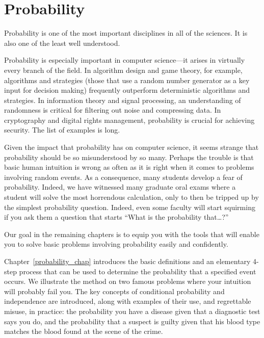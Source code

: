 \part{Probability}
\label{part:probability}

\partintro
{}

Probability is one of the most important disciplines in all of the
sciences.  It is also one of the least well understood.

Probability is especially important in computer science---it arises in
virtually every branch of the field.  In algorithm design and game
theory, for example,  algorithms and strategies
(those that use a random number generator as a key input for decision
making) frequently outperform deterministic algorithms and
strategies.  In information theory and signal processing, an
understanding of randomness is critical for filtering out noise and
compressing data.  In cryptography and digital rights management,
probability is crucial for achieving security.  The list of examples
is long.

Given the impact that probability has on computer science, it seems
strange that probability should be so misunderstood by so many.
Perhaps the trouble is that basic human intuition is wrong as often as
it is right when it comes to problems involving random events.  As a
consequence, many students develop a fear of probability.  Indeed, we
have witnessed many graduate oral exams where a student will solve the
most horrendous calculation, only to then be tripped up by the simplest
probability question.  Indeed, even some faculty will start squirming
if you ask them a question that starts ``What is the probability
that\dots?''

Our goal in the remaining chapters is to equip you with the tools that
will enable you to solve basic problems involving probability easily
and confidently.

Chapter~\ref{probability_chap} introduces the basic definitions and an
elementary 4-step process that can be used to determine the
probability that a specified event occurs.  We illustrate the method
on two famous problems where your intuition will probably fail you.
The key concepts of conditional probability and independence are
introduced, along with examples of their use, and regrettable misuse,
in practice: the probability you have a disease given that a
diagnostic test says you do, and the probability that a suspect is
guilty given that his blood type matches the blood found at the scene
of the crime.

